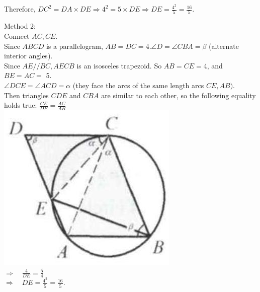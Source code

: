 \documentclass{article}
\begin{document}
Therefore, \(D C^{2}=D A \times D E \Rightarrow 4^{2}=5 \times D E \Rightarrow D E=\frac{4^{2}}{5}=\frac{16}{5}\).

Method 2:\\
Connect \(A C, C E\).\\
Since \(A B C D\) is a parallelogram, \(A B=D C=4 . \angle D=\angle C B A=\beta\) (alternate interior angles).\\
Since \(A E / / B C, A E C B\) is an isosceles trapezoid. So \(A B=C E=4\), and \(B E=A C=\) 5.\\
\(\angle D C E=\angle A C D=\alpha\) (they face the arcs of the same length arcs \(C E, A B)\).\\
Then triangles \(C D E\) and \(C B A\) are similar to each other, so the following equality holds true: \(\frac{C E}{D E}=\frac{A C}{A B}\)\\
\centering
\includegraphics[width=\textwidth]{images/168.jpg}\\
\(\Rightarrow \quad \frac{4}{D E}=\frac{5}{4}\)\\
\(\Rightarrow \quad D E=\frac{4^{2}}{5}=\frac{16}{5}\).
\end{document}
